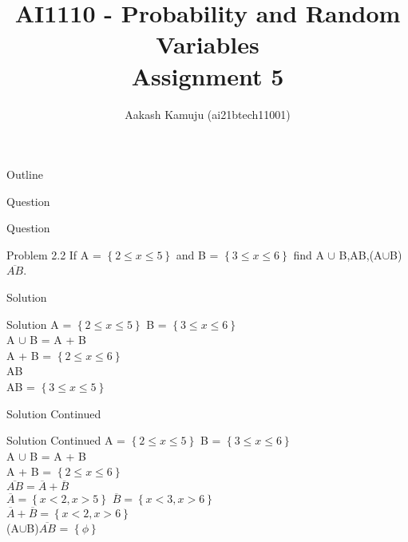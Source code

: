 \documentclass{beamer}
\title{AI1110 - Probability and Random Variables\\
        Assignment 5}
\author{Aakash Kamuju (ai21btech11001)}
\providecommand{\cbrak}[1]{\ensuremath{\left\{#1\right\}}}
\begin{document}
\maketitle
    \begin{frame}{Outline}
    \tableofcontents
    \end{frame}
    \begin{frame}{Question}
        \begin{section}{Question}
            \begin{block}{Problem 2.2}
             If A = \cbrak{2 \le x \le 5} and B = \cbrak{3 \le x \le 6} find A $\cup$ B,AB,(A$\cup$B)$\overline{AB}$.
             
   \end{block}
    \end{section}
    \end{frame}
    \begin{frame}
        \begin{section}{Solution}
            \begin{block}{Solution}
             A = \cbrak{2 \le x \le 5} B = \cbrak{3 \le x \le 6}\\
             A $\cup$ B = A + B \\
             A + B = \cbrak{2 \le x \le 6}\\
             AB\\
             AB = \cbrak{3 \le x \le 5}
   \end{block}
    \end{section}
    \end{frame}
    \begin{frame}
        \begin{section}{Solution Continued}
            \begin{block}{Solution Continued}
             A = \cbrak{2 \le x \le 5} B = \cbrak{3 \le x \le 6}\\
             A $\cup$ B = A + B \\
             A + B = \cbrak{2 \le x \le 6}\\
             $\overline {AB} = \overline A + \overline B $\\
             $\overline A = \cbrak{x < 2, x > 5 }$
             $\overline B = \cbrak{x < 3, x > 6 }$\\
             $\overline A + \overline B  = \cbrak{x < 2, x > 6 }$\\
             (A$\cup$B)$\overline{AB}$ = \cbrak{\phi}
             
             
   \end{block}
    \end{section}
    \end{frame}
\end{document}
